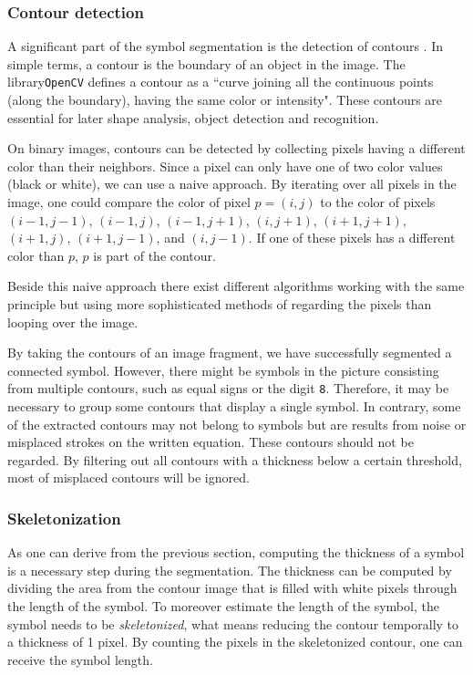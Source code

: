 \documentclass[12pt]{article}
\begin{document}
	\subsubsection{Contour detection}
	A significant part of the symbol segmentation is the detection of contours	. In simple terms, a contour is the boundary of an object in the image. The library\texttt{OpenCV} defines a contour as a ``curve joining all the continuous points (along the boundary), having the same color or intensity".
	These contours are essential for later shape analysis, object detection and recognition. 
	
	On binary images, contours can be detected by collecting pixels having a different color than their neighbors. Since a pixel can only have one of two color values (black or white), we can use a naive approach. By iterating over all pixels in the image, one could compare the color of pixel $p =(i, j)$ to the color of pixels $(i-1, j-1)$, $(i-1, j)$, $(i-1, j+1)$, $(i, j+1)$, $(i+1, j+1)$, $(i+1, j)$, $(i+1, j-1)$, and $(i, j-1)$. If one of these pixels has a different color than $p$, $p$ is part of the contour. 
	
	Beside this naive approach there exist different algorithms working with the same principle but using more sophisticated methods of regarding the pixels than looping over the image.
	
	By taking the contours of an image fragment, we have successfully segmented a connected symbol. However, there might be symbols in the picture consisting from multiple contours, such as equal signs or the digit \texttt{8}. Therefore, it may be necessary to group some contours that display a single symbol. In contrary, some of the extracted contours may not belong to symbols but are results from noise or misplaced strokes on the written equation. These contours should not be regarded. By filtering out all contours with a thickness below a certain threshold, most of misplaced contours will be ignored.
	
	\subsubsection{Skeletonization}
	As one can derive from the previous section, computing the thickness of a symbol is a necessary step during the segmentation. The thickness can be computed by dividing the area from the contour image that is filled with white pixels through the length of the symbol. To moreover estimate the length of the symbol, the symbol needs to be \textit{skeletonized}, what means reducing the contour temporally to a thickness of 1 pixel. By counting the pixels in the skeletonized contour, one can receive the symbol length.
	
\end{document}
